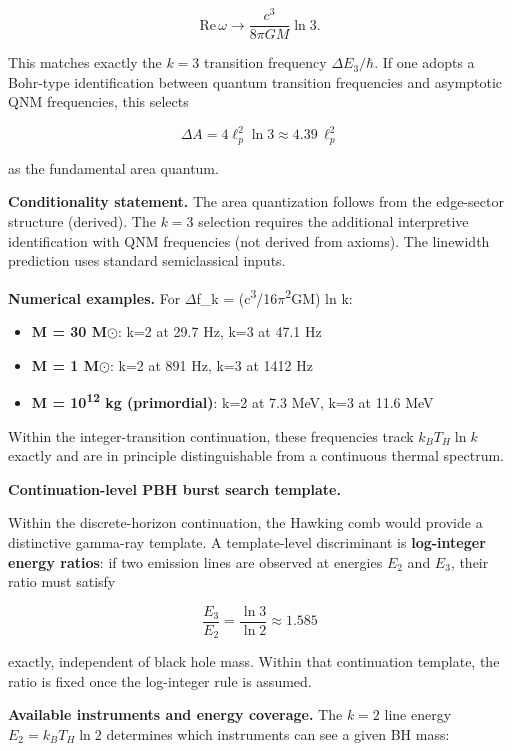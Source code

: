 \[
\mathrm{Re}\,\omega \to \frac{c^3}{8\pi G M} \ln 3.
\]

This matches exactly the \(k = 3\) transition frequency \(\Delta E_3 / \hbar\). If one adopts a Bohr-type identification between quantum transition frequencies and asymptotic QNM frequencies, this selects

\[
\Delta A = 4\ell_p^2 \ln 3 \approx 4.39 \, \ell_p^2
\]

as the fundamental area quantum.

\textbf{Conditionality statement.} The area quantization follows from the edge-sector structure (derived). The \(k = 3\) selection requires the additional interpretive identification with QNM frequencies (not derived from axioms). The linewidth prediction uses standard semiclassical inputs.

\textbf{Numerical examples.} For \ensuremath{\Delta}f\_k = (c\textsuperscript{3}/16\ensuremath{\pi}\textsuperscript{2}GM) ln k:

\begin{itemize}
\tightlist
\item
  \textbf{M = 30 M\ensuremath{\odot}}: k=2 at 29.7 Hz, k=3 at 47.1 Hz
\item
  \textbf{M = 1 M\ensuremath{\odot}}: k=2 at 891 Hz, k=3 at 1412 Hz
\item
  \textbf{M = 10\textsuperscript{1}\textsuperscript{2} kg (primordial)}: k=2 at 7.3 MeV, k=3 at 11.6 MeV
\end{itemize}

Within the integer-transition continuation, these frequencies track \(k_B T_H \ln k\) exactly and are in principle distinguishable from a continuous thermal spectrum.

\textbf{Continuation-level PBH burst search template.}

Within the discrete-horizon continuation, the Hawking comb would provide a distinctive gamma-ray template. A template-level discriminant is \textbf{log-integer energy ratios}: if two emission lines are observed at energies \(E_2\) and \(E_3\), their ratio must satisfy

\[
\frac{E_3}{E_2} = \frac{\ln 3}{\ln 2} \approx 1.585
\]

exactly, independent of black hole mass. Within that continuation template, the ratio is fixed once the log-integer rule is assumed.

\textbf{Available instruments and energy coverage.} The \(k = 2\) line energy \(E_2 = k_B T_H \ln 2\) determines which instruments can see a given BH mass:

